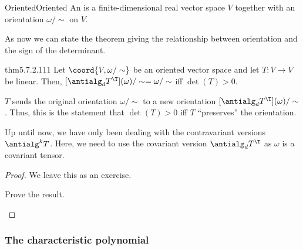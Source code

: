 \begin{dfn}{Oriented}{Oriented}
	An  is a finite-dimensional real vector space $V$ together with an orientation $\omega /\sim$ on $V$.
\end{dfn}
As now we can state the theorem giving the relationship between orientation and the sign of the determinant.
\begin{thm}{}{thm5.7.2.111}
	Let $\coord{V,\omega /\sim}$ be an oriented vector space and let $T\colon V\rightarrow V$ be linear.  Then, $[\antialg _dT^{\T}](\omega )/\sim =\omega /\sim$ iff $\det (T)>0$.
	\begin{rmk}
		$T$ sends the original orientation $\omega /\sim$ to a new orientation $[\antialg _dT^{\T}](\omega )/\sim$.  Thus, this is the statement that $\det (T)>0$ iff $T$ ``preserves'' the orientation.
	\end{rmk}
	\begin{rmk}
		Up until now, we have only been dealing with the contravariant versions $\antialg ^kT$.  Here, we need to use the covariant version $\antialg _dT^{\T}$ as $\omega$ is a covariant tensor.
	\end{rmk}
	\begin{proof}
		We leave this as an exercise.
		\begin{exr}[breakable=false]{}{}
			Prove the result.
		\end{exr}
	\end{proof}
\end{thm}

\subsubsection{The characteristic polynomial}


